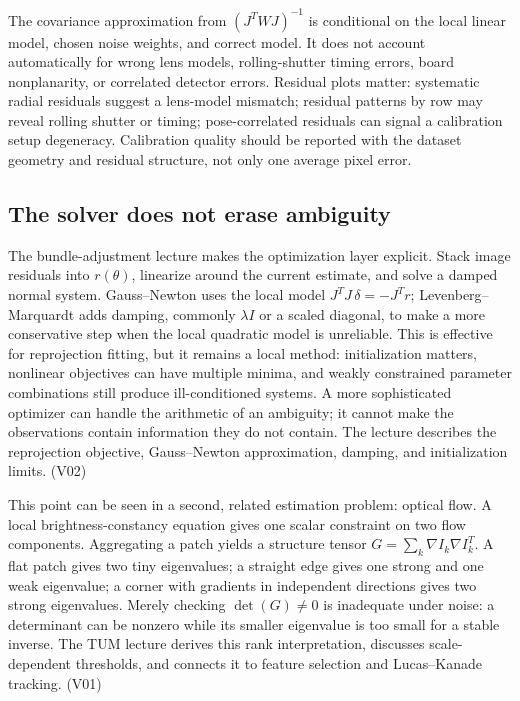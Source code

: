 The covariance approximation from \((J^T WJ)^{-1}\) is conditional on the local linear model, chosen noise weights, and correct model. It does not account automatically for wrong lens models, rolling-shutter timing errors, board nonplanarity, or correlated detector errors. Residual plots matter: systematic radial residuals suggest a lens-model mismatch; residual patterns by row may reveal rolling shutter or timing; pose-correlated residuals can signal a calibration setup degeneracy. Calibration quality should be reported with the dataset geometry and residual structure, not only one average pixel error.

\subsection{The solver does not erase ambiguity}\label{02-foundations-ii-ch036-the-solver-does-not-erase-ambiguity}

\hypertarget{02-foundations-ii-ch036-the-solver-does-not-erase-ambiguity}{}

The bundle-adjustment lecture makes the optimization layer explicit. Stack image residuals into \(r(\theta)\), linearize around the current estimate, and solve a damped normal system. Gauss--Newton uses the local model \(J^TJ\,\delta=-J^Tr\); Levenberg--Marquardt adds damping, commonly \(\lambda I\) or a scaled diagonal, to make a more conservative step when the local quadratic model is unreliable. This is effective for reprojection fitting, but it remains a local method: initialization matters, nonlinear objectives can have multiple minima, and weakly constrained parameter combinations still produce ill-conditioned systems. A more sophisticated optimizer can handle the arithmetic of an ambiguity; it cannot make the observations contain information they do not contain. The lecture describes the reprojection objective, Gauss--Newton approximation, damping, and initialization limits. (V02)

This point can be seen in a second, related estimation problem: optical flow. A local brightness-constancy equation gives one scalar constraint on two flow components. Aggregating a patch yields a structure tensor \(G=\sum_k \nabla I_k\nabla I_k^T\). A flat patch gives two tiny eigenvalues; a straight edge gives one strong and one weak eigenvalue; a corner with gradients in independent directions gives two strong eigenvalues. Merely checking \(\det(G)\ne0\) is inadequate under noise: a determinant can be nonzero while its smaller eigenvalue is too small for a stable inverse. The TUM lecture derives this rank interpretation, discusses scale-dependent thresholds, and connects it to feature selection and Lucas--Kanade tracking. (V01)

